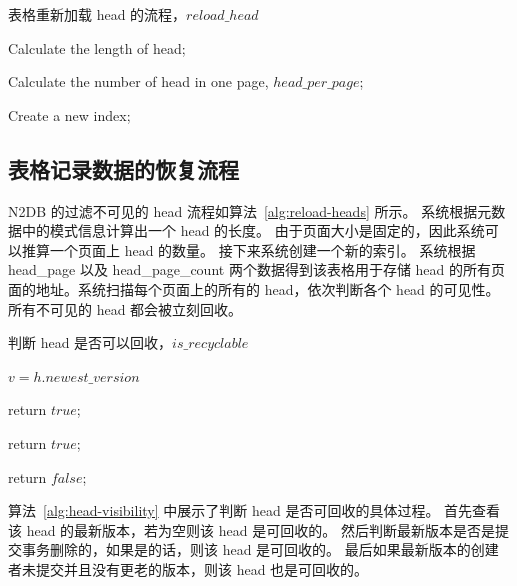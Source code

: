 \begin{algorithm}[ht]
    \caption{表格重新加载 head 的流程，$reload\_head$}
    \label{alg:reload-heads}
    \BlankLine

    Calculate the length of head;

    Calculate the number of head in one page, $head\_per\_page$;

    Create a new index;

    {
    }
\end{algorithm}


\subsection{表格记录数据的恢复流程}
\label{ssec:record-data-recovery}

N2DB 的过滤不可见的 head 流程如算法~\ref{alg:reload-heads} 所示。
系统根据元数据中的模式信息计算出一个 head 的长度。
由于页面大小是固定的，因此系统可以推算一个页面上 head 的数量。
接下来系统创建一个新的索引。
系统根据 head\_page 以及 head\_page\_count 两个数据得到该表格用于存储 head 的所有页面的地址。系统扫描每个页面上的所有的 head，依次判断各个 head 的可见性。所有不可见的 head 都会被立刻回收。


\begin{algorithm}[ht]
    \caption{判断 head 是否可以回收，$is\_recyclable$}
    \label{alg:head-visibility}
    \BlankLine

    $v = h.newest\_version$



     {
        return $true$;
    }

     {
        return $true$;
    }

    return $false$;


\end{algorithm}

算法~\ref{alg:head-visibility} 中展示了判断 head 是否可回收的具体过程。
首先查看该 head 的最新版本，若为空则该 head 是可回收的。
然后判断最新版本是否是提交事务删除的，如果是的话，则该 head 是可回收的。
最后如果最新版本的创建者未提交并且没有更老的版本，则该 head 也是可回收的。
